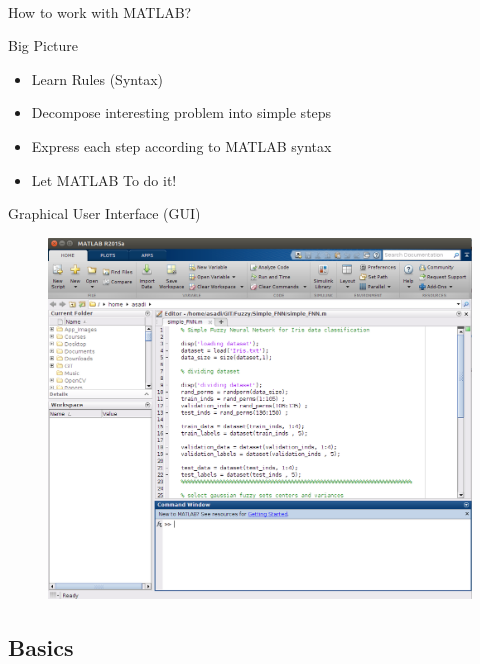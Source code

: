 \documentclass{beamer}
\begin{document}
\begin{frame}{\\How to work with MATLAB?}
	\begin{block}{Big Picture}
		\begin{itemize}
			\item Learn Rules (Syntax)
			\item Decompose interesting problem into simple steps
			\item Express each step according to MATLAB syntax
			\item Let MATLAB To do it!
		\end{itemize}
	\end{block}
\end{frame}


\begin{frame}{Graphical User Interface (GUI)}
	\begin{block}{}
		\begin{figure}
			\center
			\includegraphics[scale=0.25]{./Imgs/GUI.png}
		\end{figure}
	\end{block}
\end{frame}


\subsection{Basics}
\end{document}

